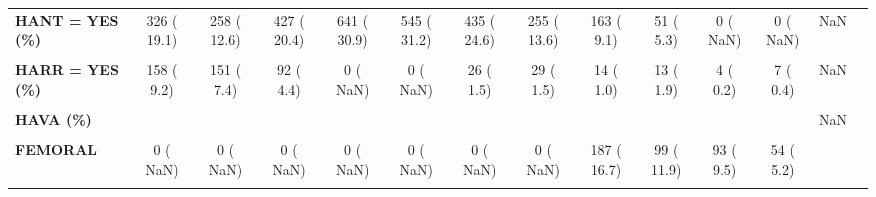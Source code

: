 \documentclass[
]{article}
\begin{document}
\begin{table}[H]
\begin{tabular}[t]{>{\raggedright\arraybackslash}p{5em}ccccccccccccc}
\textbf{HANT = YES (\%)} & 326 ( 19.1) & 258 ( 12.6) & 427 ( 20.4) & 641 ( 30.9) & 545 ( 31.2) & 435 ( 24.6) & 255 ( 13.6) & 163 (  9.1) & 51 (  5.3) & 0 (  NaN) & 0 (  NaN) & NaN & \\
\textbf{\cellcolor{gray!10}{HARBL = YES (\%)}} & \cellcolor{gray!10}{0 (  NaN)} & \cellcolor{gray!10}{0 (  NaN)} & \cellcolor{gray!10}{0 (  NaN)} & \cellcolor{gray!10}{0 (  NaN)} & \cellcolor{gray!10}{138 (  7.9)} & \cellcolor{gray!10}{156 (  8.8)} & \cellcolor{gray!10}{249 ( 13.2)} & \cellcolor{gray!10}{289 ( 19.3)} & \cellcolor{gray!10}{281 ( 33.1)} & \cellcolor{gray!10}{191 ( 10.9)} & \cellcolor{gray!10}{209 ( 11.9)} & \cellcolor{gray!10}{NaN} & \cellcolor{gray!10}{}\\
\textbf{HARR = YES (\%)} & 158 (  9.2) & 151 (  7.4) & 92 (  4.4) & 0 (  NaN) & 0 (  NaN) & 26 (  1.5) & 29 (  1.5) & 14 (  1.0) & 13 (  1.9) & 4 (  0.2) & 7 (  0.4) & NaN & \\
\textbf{\cellcolor{gray!10}{HASA = YES (\%)}} & \cellcolor{gray!10}{1694 ( 96.0)} & \cellcolor{gray!10}{1885 ( 92.0)} & \cellcolor{gray!10}{2021 ( 96.5)} & \cellcolor{gray!10}{2012 ( 97.0)} & \cellcolor{gray!10}{1702 ( 97.5)} & \cellcolor{gray!10}{1740 ( 97.8)} & \cellcolor{gray!10}{1813 ( 96.2)} & \cellcolor{gray!10}{1742 ( 97.3)} & \cellcolor{gray!10}{1674 ( 98.0)} & \cellcolor{gray!10}{1154 ( 65.9)} & \cellcolor{gray!10}{986 ( 56.2)} & \cellcolor{gray!10}{<0.001} & \cellcolor{gray!10}{}\\
\textbf{HAVA (\%)} &  &  &  &  &  &  &  &  &  &  &  & NaN & \\
\textbf{\cellcolor{gray!10}{BOTH}} & \cellcolor{gray!10}{0 (  NaN)} & \cellcolor{gray!10}{0 (  NaN)} & \cellcolor{gray!10}{0 (  NaN)} & \cellcolor{gray!10}{0 (  NaN)} & \cellcolor{gray!10}{0 (  NaN)} & \cellcolor{gray!10}{0 (  NaN)} & \cellcolor{gray!10}{0 (  NaN)} & \cellcolor{gray!10}{19 (  1.7)} & \cellcolor{gray!10}{26 (  3.1)} & \cellcolor{gray!10}{10 (  1.0)} & \cellcolor{gray!10}{6 (  0.6)} & \cellcolor{gray!10}{} & \cellcolor{gray!10}{}\\
\textbf{FEMORAL} & 0 (  NaN) & 0 (  NaN) & 0 (  NaN) & 0 (  NaN) & 0 (  NaN) & 0 (  NaN) & 0 (  NaN) & 187 ( 16.7) & 99 ( 11.9) & 93 (  9.5) & 54 (  5.2) &  & \\
\textbf{\cellcolor{gray!10}{RADIAL}} & \cellcolor{gray!10}{0 (  NaN)} & \cellcolor{gray!10}{0 (  NaN)} & \cellcolor{gray!10}{0 (  NaN)} & \cellcolor{gray!10}{0 (  NaN)} & \cellcolor{gray!10}{0 (  NaN)} & \cellcolor{gray!10}{0 (  NaN)} & \cellcolor{gray!10}{0 (  NaN)} & \cellcolor{gray!10}{917 ( 81.7)} & \cellcolor{gray!10}{710 ( 85.0)} & \cellcolor{gray!10}{871 ( 89.4)} & \cellcolor{gray!10}{987 ( 94.3)} & \cellcolor{gray!10}{} & \cellcolor{gray!10}{}\\

\end{tabular}
\end{table}
\end{document}
